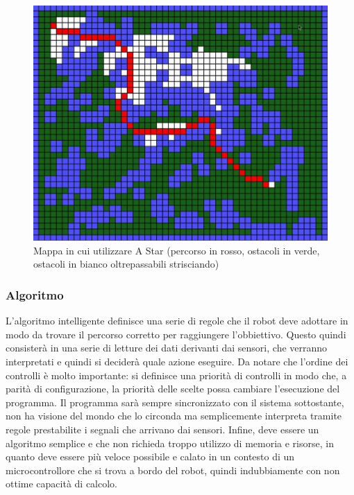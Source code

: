 \documentclass[11pt]{article} %
\begin{document}
\begin{figure}[htbp]
\centering
\includegraphics[scale=0.3]{a_star.jpg}
\caption{Mappa in cui utilizzare A Star (percorso in rosso, ostacoli in verde, ostacoli in bianco oltrepassabili strisciando)}\label{fig:8}
\end{figure}

\subsubsection{Algoritmo}

L'algoritmo intelligente definisce una serie di regole che il robot deve adottare in modo da trovare il percorso corretto per raggiungere l'obbiettivo. Questo quindi consisterà in una serie di letture dei dati derivanti dai sensori, che verranno interpretati e quindi si deciderà quale azione eseguire. Da notare che l'ordine dei controlli è molto importante: si definisce una priorità di controlli in modo che, a parità di configurazione, la priorità delle scelte possa cambiare l'esecuzione del programma.
Il programma sarà sempre sincronizzato con il sistema sottostante, non ha visione del mondo che lo circonda ma semplicemente interpreta tramite regole prestabilite i segnali che arrivano dai sensori. Infine, deve essere un algoritmo semplice e che non richieda troppo utilizzo di memoria e risorse, in quanto deve essere più veloce possibile e calato in un contesto di un microcontrollore che si trova a bordo del robot, quindi indubbiamente con non ottime capacità di calcolo.
\end{document}
